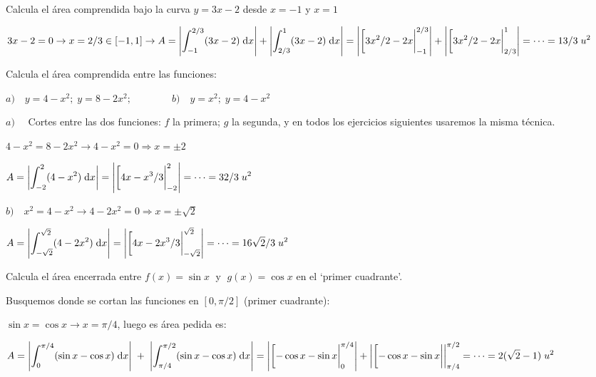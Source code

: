 \begin{ejre}
	Calcula el área comprendida bajo la curva $y=3x-2$ desde $x=-1$ y $x=1$
\end{ejre}
\begin{proofw}\renewcommand{\qedsymbol}{$\diamond$}	
$3x-2=0\to x=2/3 \in [-1,1] \to \displaystyle A=\left|\int_{-1}^{2/3}(3x-2)\; \dd x \right| + \left| \int_{2/3}^1 (3x-2)\; \dd x\right|=\left| \eval [3x^2/2-2x|_{-1}^{2/3} \right| + \left| \eval [3x^2/2-2x|_{2/3}^{1} \right| = \cdots = 13/3 \; u^2  $	
\end{proofw}

\begin{ejre}
	Calcula el área comprendida entre las funciones:
	
	$a)\quad \displaystyle y=4-x^2; \; y= 8-2x^2; \qquad \qquad b) \quad y=x^2; \; y=4-x^2$
\end{ejre}
\begin{proofw}\renewcommand{\qedsymbol}{$\diamond$}	


\hspace{6mm}$a)\quad $ Cortes entre las dos funciones: $f$ la primera; $g$ la segunda, y en todos los ejercicios siguientes usaremos la misma técnica.

$4-x^2=8-2x^2 \to 4-x^2=0 \Rightarrow x=\pm 2$

$A=\displaystyle \left| \int_{-2}^{2} (4-x^2)\; \dd x \right| = \left| \eval [4x-x^3/3|_{-2}^2 \right|=\cdots=32/3 \; u^2$	

$b)\quad \displaystyle x^2=4-x^2 \to 4-2x^2=0 \Rightarrow x=\pm \sqrt{2}$

$A=\displaystyle \left| \int_{-\sqrt{2}}^{\sqrt{2}} (4-2x^2)\; \dd x \right| = \left| \eval [4x-2x^3/3|_{-\sqrt{2}}^{\sqrt{2}} \right|=\cdots=16\sqrt{2}/3 \; u^2$	

\end{proofw}

\begin{ejre}
	
Calcula el área encerrada entre $f(x)=\sin x \;$  y $\; g(x)=\cos x$ en el `primer cuadrante'.

\end{ejre}


\begin{proofw}\renewcommand{\qedsymbol}{$\diamond$}

Busquemos donde se cortan las funciones en $[0,\pi/2]$ (primer cuadrante):

$\sin x=\cos x \to x=\pi/4$, luego es área pedida es:

$A=\displaystyle \left| \int_{0}^{\pi/4} (\sin x - \cos x)\; \dd x \right| \; +\; \left| \int_{\pi/4}^{\pi/2} (\sin x - \cos x)\; \dd x \right| = \left| \eval [-\cos x - \sin x|_{0}^{\pi/4} \right| + \left| \eval [-\cos x - \sin x| \right|_{\pi/4}^{\pi/2} = \cdots = 2(\sqrt{2}-1)\; u^2$
	
\end{proofw}



